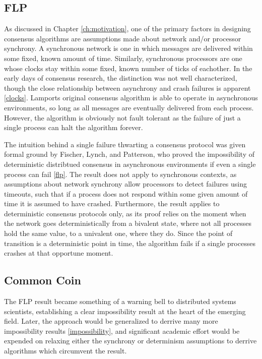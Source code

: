\subsection{FLP}
As discussed in Chapter \ref{ch:motivation}, one of the primary factors in designing consensus algorithms are assumptions made about network and/or processor synchrony. A synchronous network is one in which messages are delivered within some fixed, known amount of time. Similarly, synchronous processors are one whose clocks stay within some fixed, known number of ticks of eachother.
In the early days of consensus research, the distinction was not well characterized, though the close relationship between asynchrony and crash failures is apparent \ref{clocks}.
Lamports original consensus algorithm is able to operate in asynchronous environments, 
so long as all messages are eventually delivered from each process.
However, the algorithm is obviously not fault tolerant as the failure of just a single process can halt the algorithm forever.

The intuition behind a single failure thwarting a consensus protocol was given formal ground by Fischer, Lynch, and Patterson,
who proved the impossibility of deterministic distribtued consensus in asynchronous environments if even a single process can fail \ref{flp}.
The result does not apply to synchronous contexts, as assumptions about network synchrony allow processors to detect failures using timeouts, such that if a process does not respond within some given amount of time it is assumed to have crashed.
Furthermore, the result applies to deterministic consensus protocols only, 
as its proof relies on the moment when the network goes deterministically from a bivalent state, 
where not all processes hold the same value, to a univalent one, where they do.
Since the point of transition is a deterministic point in time, 
the algorithm fails if a single processes crashes at that opportune moment.

\subsection{Common Coin}

The FLP result became something of a warning bell to distributed systems scientists, 
establishing a clear impossibility result at the heart of the emerging field.
Later, the approach would be generalized to derrive many more impossibility results \ref{impossibility},
and significant academic effort would be expended on relaxing either the synchrony or determinism assumptions to derrive algorithms which circumvent the result.


